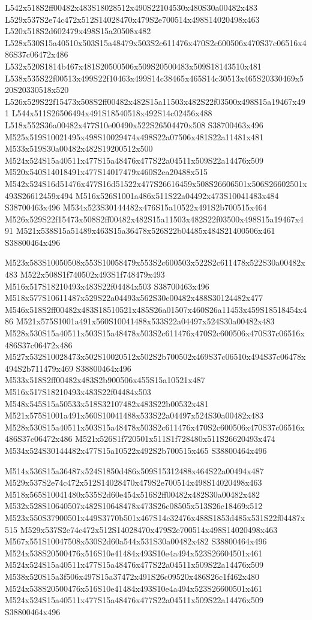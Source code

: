 \documentclass{article}
\begin{document}
\begin{multicols}{2}
L542x518S2ff00482x483S18028512x490S22104530x480S30a00482x483 L529x537S2e74c472x512S14028470x479S2e700514x498S14020498x463 L520x518S2d602479x498S15a20508x482 L528x530S15a40510x503S15a48479x503S2c611476x470S2c600506x470S37c06516x486S37c06472x486 L532x520S1814b467x481S20500506x509S20500483x509S18143510x481 L538x535S22f00513x499S22f10463x499S14c38465x465S14c30513x465S20330469x520S20330518x520 L526x529S22f15473x508S2ff00482x482S15a11503x482S22f03500x498S15a19467x491 L544x511S26506494x491S18540518x492S14c02456x488 L518x552S36a00482x477S10e00490x522S26504470x508 S38700463x496 M525x519S10021495x498S10029474x498S22a07506x481S22a11481x481 M533x519S30a00482x482S19200512x500 M524x524S15a40511x477S15a48476x477S22a04511x509S22a14476x509 M520x540S14018491x477S14017479x460S2ea20488x515 M542x524S16d51476x477S16d51522x477S26616459x508S26606501x506S26602501x493S26612459x494 M516x526S1001a486x511S22a04492x473S10041483x484 S38700463x496 M534x523S30144482x476S15a10522x491S2b700515x464 M526x529S22f15473x508S2ff00482x482S15a11503x482S22f03500x498S15a19467x491 M521x538S15a51489x463S15a36478x526S22b04485x484S21400506x461 S38800464x496

M523x583S10050508x553S10058479x553S2c600503x522S2c611478x522S30a00482x483 M522x508S1f740502x493S1f748479x493 M516x517S18210493x483S22f04484x503 S38700463x496 M518x577S10611487x529S22a04493x562S30e00482x488S30124482x477 M546x518S2ff00482x483S18510521x485S26a01507x460S26a11453x459S18518454x486 M521x575S1001a491x560S10041488x533S22a04497x524S30a00482x483 M528x530S15a40511x503S15a48478x503S2c611476x470S2c600506x470S37c06516x486S37c06472x486 M527x532S10028473x502S10020512x502S2b700502x469S37c06510x494S37c06478x494S2b711479x469 S38800464x496 M533x518S2ff00482x483S2b900506x455S15a10521x487 M516x517S18210493x483S22f04484x503 M548x545S15a50533x518S32107482x483S22b00532x481 M521x575S1001a491x560S10041488x533S22a04497x524S30a00482x483 M528x530S15a40511x503S15a48478x503S2c611476x470S2c600506x470S37c06516x486S37c06472x486 M521x526S1f720501x511S1f728480x511S26620493x474 M534x524S30144482x477S15a10522x492S2b700515x465 S38800464x496

M514x536S15a36487x524S1850d486x509S15312488x464S22a00494x487 M529x537S2e74c472x512S14028470x479S2e700514x498S14020498x463 M518x565S10041480x535S2d60e454x516S2ff00482x482S30a00482x482 M532x528S10640507x482S10648478x473S26c08505x513S26c18469x512 M523x550S37900501x449S3770b501x467S14c32476x488S1853d485x531S22f04487x515 M529x537S2e74c472x512S14028470x479S2e700514x498S14020498x463 M567x551S10047508x530S2d60a544x531S30a00482x482 S38800464x496 M524x538S20500476x516S10e41484x493S10e4a494x523S26604501x461 M524x524S15a40511x477S15a48476x477S22a04511x509S22a14476x509 M538x520S15a3f506x497S15a37472x491S26c09520x486S26c1f462x480 M524x538S20500476x516S10e41484x493S10e4a494x523S26600501x461 M524x524S15a40511x477S15a48476x477S22a04511x509S22a14476x509 S38800464x496


\end{multicols}
\end{document}

